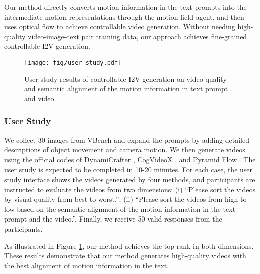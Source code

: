 Our method directly converts motion information in the text prompts into the intermediate motion representations through the motion field agent, and then uses optical flow to achieve controllable video generation. Without needing high-quality video-image-text pair training data, our approach achieves fine-grained controllable I2V generation.

\begin{figure}[t]
\centering
\texttt{[image: fig/user\_study.pdf]}
\caption{User study results of controllable I2V generation on video quality and semantic alignment of the motion information in text prompt and video.}
\label{fig:us}
\end{figure}

\subsubsection{User Study}
\label{subsubsec: user}
We collect 30 images from VBench \cite{huang2024vbench} and expand the prompts by adding detailed descriptions of object movement and camera motion. We then generate videos using the official codes of DynamiCrafter \cite{xing2025dynamicrafter}, CogVideoX \cite{yang2024cogvideox}, and Pyramid Flow \cite{jin2024pyramidal}. The user study is expected to be completed in 10-20 minutes. For each case, the user study interface shows the videos generated by four methods, and participants are instructed to evaluate the videos from two dimensions: (i) “Please sort the videos by visual quality from best to worst.”; (ii) “Please sort the videos from high to low based on the semantic alignment of the motion information in the text prompt and the video.”. Finally, we receive 50 valid responses from the participants.

As illustrated in Figure \ref{fig:us}, our method achieves the top rank in both dimensions. These results demonstrate that our method generates high-quality videos with the best alignment of motion information in the text.


